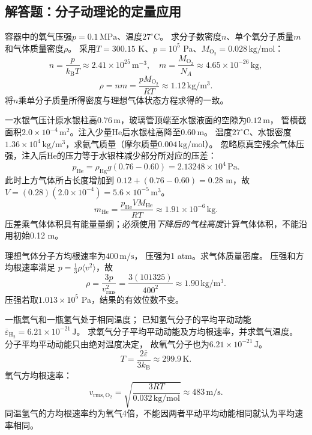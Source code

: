 \subsection{解答题：分子动理论的定量应用}

\problemtext 容器中的氧气压强$p=0.1\,\mathrm{MPa}$、温度$27^\circ\mathrm C$。
求分子数密度$n$、单个氧分子质量$m$和气体质量密度$\rho$。
\workings
采用$T=300.15$ K、$p=10^5$ Pa、$M_{\mathrm{O_2}}=0.028\,\mathrm{kg/mol}$：
\[
\boxed{n=\frac{p}{k_{\mathrm B}T}\approx
2.41\times10^{25}\,\mathrm{m^{-3}}},
\quad
\boxed{m=\frac{M_{\mathrm{O_2}}}{N_A}
\approx4.65\times10^{-26}\,\mathrm{kg}},
\]
\[
\boxed{\rho=nm=\frac{pM_{\mathrm{O_2}}}{RT}
\approx1.12\,\mathrm{kg/m^3}}.
\]
\crosscheck 将$n$乘单分子质量所得密度与理想气体状态方程求得的一致。

\problemtext 一水银气压计原水银柱高$0.76\,\mathrm m$，玻璃管顶端至水银液面的空隙为$0.12\,\mathrm m$，
管横截面积$2.0\times10^{-4}\,\mathrm{m^2}$。注入少量He后水银柱高降至$0.60\,\mathrm m$。
温度$27^\circ\mathrm C$、水银密度$1.36\times10^4\,\mathrm{kg/m^3}$，求氦气质量（摩尔质量$0.004\,\mathrm{kg/mol}$）。
\workings
忽略原真空残余气体压强，注入后He的压力等于水银柱减少部分所对应的压差：
\[
p_{\mathrm{He}}=\rho_{\mathrm{Hg}}g(0.76-0.60)
=2.13248\times10^4\,\mathrm{Pa}.
\]
此时上方气体所占长度增加到
$0.12+(0.76-0.60)=0.28$ m，故
$V=(0.28)(2.0\times10^{-4})=5.6\times10^{-5}\,\mathrm{m^3}$。
\[
\boxed{m_{\mathrm{He}}
=\frac{p_{\mathrm{He}}VM_{\mathrm{He}}}{RT}
\approx1.91\times10^{-6}\,\mathrm{kg}}.
\]
\crosscheck 压差乘气体体积具有能量量纲；必须使用\emph{下降后的气柱高度}计算气体体积，不能沿用初始0.12 m。

\problemtext 理想气体分子方均根速率为$400\,\mathrm{m/s}$，
压强为1 atm。求气体质量密度。
\workings
压强和方均根速率满足
$p=\frac13\rho\langle v^2\rangle$，故
\[
\boxed{\rho=\frac{3p}{v_{\mathrm{rms}}^2}
=\frac{3(101325)}{400^2}
\approx1.90\,\mathrm{kg/m^3}}.
\]
\crosscheck 压强若取$1.013\times10^5$ Pa，结果的有效位数不变。

\problemtext 一瓶氧气和一瓶氢气处于相同温度；
已知氢气分子的平均平动动能
$\overline\varepsilon_{\mathrm H_2}=6.21\times10^{-21}\,\mathrm J$。
求氧气分子平均平动动能及方均根速率，并求氧气温度。
\workings
分子平均平动动能只由绝对温度决定，
故氧气分子也为$\boxed{6.21\times10^{-21}\,\mathrm J}$。
\[
T=\frac{2\overline\varepsilon}{3k_{\mathrm B}}
\approx\boxed{299.9\,\mathrm K}.
\]
氧气方均根速率：
\[
\boxed{v_{\mathrm{rms,O_2}}
=\sqrt{\frac{3RT}{0.032\,\mathrm{kg/mol}}}
\approx483\,\mathrm{m/s}}.
\]
\crosscheck 同温氢气的方均根速率约为氧气4倍，不能因两者平动平均动能相同就认为平均速率相同。


